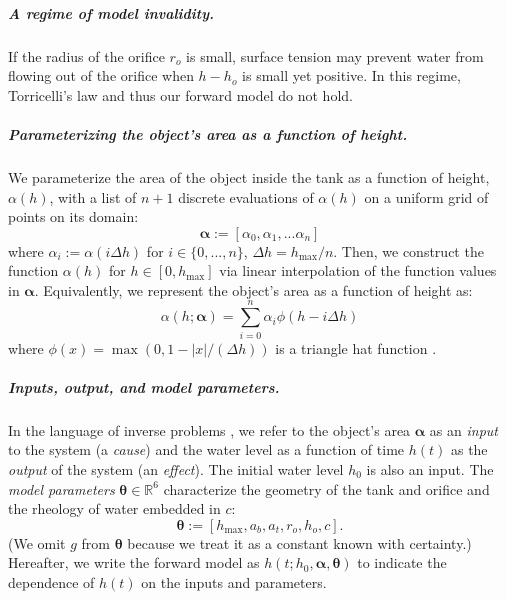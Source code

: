\documentclass[openacc]{rsproca_new}%
\newcommand\themodel {$h(t; h_0, \boldsymbol \alpha, \boldsymbol\theta)$\xspace}
\begin{document}
\vspace{-\baselineskip}
\subparagraph{A regime of model invalidity.} If the radius of the orifice $r_o$ is small, surface tension may prevent water from flowing out of the orifice when $h- h_o$ is small yet positive. In this regime, Torricelli's law and thus our forward model do not hold.

\vspace{-\baselineskip}
\subparagraph{Parameterizing the object's area as a function of height.}
We parameterize the area of the object inside the tank as a function of height, $\alpha(h)$, with a list of $n+1$ discrete evaluations of $\alpha(h)$ on a uniform grid of points on its domain:
\begin{equation}
	\boldsymbol \alpha := [\alpha_0, \alpha_1, ... \alpha_n] \label{eq:alpha}
\end{equation}
where $\alpha_i :=\alpha(i \Delta h)$ for $i \in \{0, ..., n\}$, $\Delta h = h_{\text{max}}/n$. Then, we construct the function $\alpha(h)$ for $h\in [0, h_{\text{max}}]$ via linear interpolation of the function values in $\boldsymbol \alpha$. Equivalently, we represent the object's area as a function of height as:
\begin{equation}
	\alpha(h; \boldsymbol \alpha) = \sum_{i=0}^n \alpha_i \phi(h-i \Delta h) \label{eq:alpha_basis}
\end{equation} where $\phi(x)= \max(0, 1-\lvert x \rvert / (\Delta h)) $ is a triangle hat function \cite{hat_functions}.

\vspace{-\baselineskip}
\subparagraph{Inputs, output, and model parameters.} 
In the language of inverse problems \cite{groetsch1999inverse,waqar2023tutorial}, we refer to the object's area $\boldsymbol \alpha$ as an \emph{input} to the system (a \emph{cause}) and the water level as a function of time $h(t)$ as the \emph{output} of the system (an \emph{effect}).
The initial water level $h_0$ is also an input.  
The \emph{model parameters} $\boldsymbol \theta \in \mathbb{R}^6$ characterize the geometry of the tank and orifice and the rheology of water embedded in $c$:
\begin{equation}
	\boldsymbol \theta := [h_{\text{max}}, a_b, a_t, r_o, h_o, c]. \label{eq:theta}
\end{equation}
(We omit $g$ from $\boldsymbol \theta$ because we treat it as a constant known with certainty.)
Hereafter, we write the forward model as \themodel to indicate the dependence of $h(t)$ on the inputs and parameters.
\end{document}
